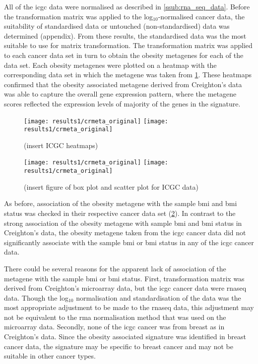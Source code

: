 All of the \gls{icgc} data were normalised as described in \cref{ssub:rna_seq_data}.
Before the transformation matrix was applied to the log$_{10}$-normalised cancer data, the suitability of standardised data or untouched (non-standardised) data was determined (appendix).
From these results, the standardised data was the most suitable to use for matrix transformation.
The transformation matrix was applied to each cancer data set in turn to obtain the obesity metagenes for each of the data set.
Each obesity metagenes were plotted on a heatmap with the corresponding data set in which the metagene was taken from \cref{fig:crmetaicgc1}.
These heatmaps confirmed that the obesity associated metagene derived from Creighton's data was able to capture the overall gene expression pattern, where the metagene scores reflected the expression levels of majority of the genes in the signature.

\begin{figure}[htp!]
	\centering
	\texttt{[image: results1/crmeta\_original]}
	\hfill
	\texttt{[image: results1/crmeta\_original]}
	\caption[Creighton metagene and \acrshort{icgc} cancer data]{(insert ICGC heatmaps)}
	\label{fig:crmetaicgc1}
\end{figure}

\begin{figure}[htp!]
	\centering
	\texttt{[image: results1/crmeta\_original]}
	\hfill
	\texttt{[image: results1/crmeta\_original]}
	\caption[Creighton metagene and sample \gls{bmi}/\gls{bmi} status in \acrshort{icgc} data]{(insert figure of box plot and scatter plot for ICGC data)}
	\label{fig:crmetaboxicgc1}
\end{figure}

As before, association of the obesity metagene with the sample \gls{bmi} and \gls{bmi} status was checked in their respective cancer data set (\cref{fig:crmetaboxicgc1}).
In contrast to the strong association of the obesity metagene with sample \gls{bmi} and \gls{bmi} status in Creighton's data, the obesity metagene taken from the \gls{icgc} cancer data did not significantly associate with the sample \gls{bmi} or \gls{bmi} status in any of the \gls{icgc} cancer data.

There could be several reasons for the apparent lack of association of the metagene with the sample \gls{bmi} or \gls{bmi} status.
First, transformation matrix was derived from Creighton's microarray data, but the \gls{icgc} cancer data were \gls{rnaseq} data.
Though the log$_{10}$ normalisation and standardisation of the data was the most appropriate adjustment to be made to the \gls{rnaseq} data, this adjustment may not be equivalent to the \gls{rma} normalisation method that was used on the microarray data.
Secondly, none of the \gls{icgc} cancer was from breast as in Creighton's data.
Since the obesity associated signature was identified in breast cancer data, the signature may be specific to breast cancer and may not be suitable in other cancer types.
\\

